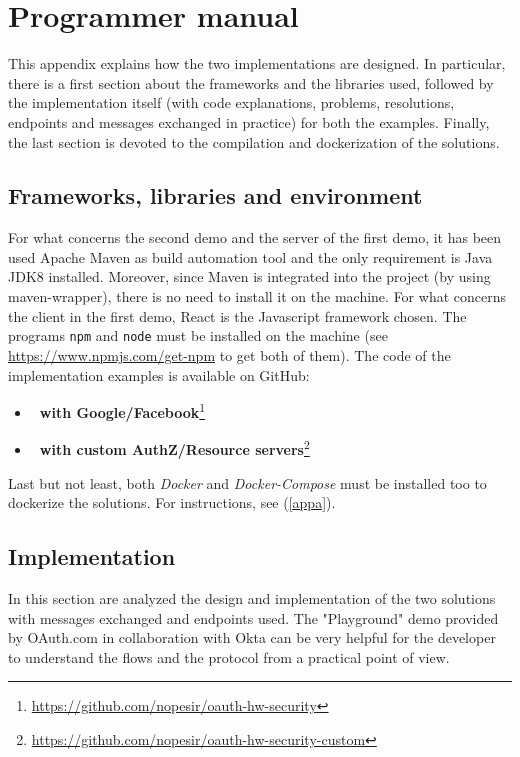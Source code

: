 
\chapter{Programmer manual}
This appendix explains how the two implementations are designed. In particular, there is a first section about the frameworks and the libraries used, followed by the implementation itself (with code explanations, problems, resolutions, endpoints and messages exchanged in practice) for both the examples. Finally, the last section is devoted to the compilation and dockerization of the solutions.

\section{Frameworks, libraries and environment}
For what concerns the second demo and the server of the first demo, it has been used Apache Maven as build automation tool and the only requirement is Java JDK8 installed. Moreover, since Maven is integrated into the project (by using maven-wrapper), there is no need to install it on the machine.
For what concerns the client in the first demo, React is the Javascript framework chosen. The programs \texttt{npm} and \texttt{node} must be installed on the machine (see \url{https://www.npmjs.com/get-npm} to get both of them). 
The code of the implementation examples is available on GitHub:

\begin{itemize}
    \item \textbf{\oauth\ with Google/Facebook}\footnote{\url{https://github.com/nopesir/oauth-hw-security}}
    \item \textbf{\oauth\ with custom AuthZ/Resource servers}\footnote{\url{https://github.com/nopesir/oauth-hw-security-custom}}
\end{itemize}

Last but not least, both \textit{Docker} and \textit{Docker-Compose} must be installed too to dockerize the solutions. For instructions, see (\ref{appa}).

\section{Implementation}
In this section are analyzed the design and implementation of the two solutions with messages exchanged and endpoints used. The "Playground" demo provided by OAuth.com in collaboration with Okta \cite{playgr} can be very helpful for the developer to understand the flows and the protocol from a practical point of view. 

